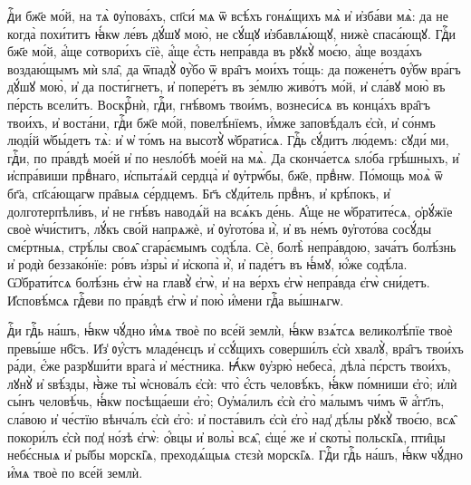 
%
дⷭ҇и бж҃е мо́й, на тѧ̀ ᲂу҆пова́хъ, сп҃си́ мѧ ѿ всѣ́хъ гонѧ́щихъ мѧ̀ и҆ и҆зба́ви мѧ̀:
да не когда̀ похи́титъ ꙗ҆́кѡ ле́въ дꙋ́шꙋ мою̀, не сꙋ́щꙋ и҆збавлѧ́ющꙋ, нижѐ спаса́ющꙋ.
Гдⷭ҇и бж҃е мо́й, а҆́ще сотвори́хъ сїѐ, а҆́ще є҆́сть непра́вда въ рꙋкꙋ̀ моє́ю,
а҆́ще возда́хъ воздаю́щымъ мѝ ѕла̑, да ѿпадꙋ̀ ᲂу҆̀бо ѿ вра̑гъ мои́хъ то́щь:
да пожене́тъ ᲂу҆́бѡ вра́гъ дꙋ́шꙋ мою̀, и҆ да пости́гнетъ, и҆ попере́тъ въ зе́млю живо́тъ мо́й, и҆ сла́вꙋ мою̀ въ пе́рсть всели́тъ.
Воскрⷭ҇нѝ, гдⷭ҇и, гнѣ́вомъ твои́мъ, вознеси́сѧ въ конца́хъ вра̑гъ твои́хъ, и҆ воста́ни, гдⷭ҇и бж҃е мо́й, повелѣ́нїемъ, и҆́мже заповѣ́далъ є҆сѝ,
и҆ со́нмъ люді́й ѡ҆бы́детъ тѧ̀: и҆ ѡ҆ то́мъ на высотꙋ̀ ѡ҆брати́сѧ.
Гдⷭ҇ь сꙋ́дитъ лю́демъ: сꙋди́ ми, гдⷭ҇и, по пра́вдѣ мое́й и҆ по неѕло́бѣ мое́й на мѧ̀.
Да сконча́етсѧ ѕло́ба грѣ́шныхъ, и҆ и҆спра́виши првⷣнаго, и҆спыта́ѧй сердца̀ и҆ ᲂу҆трѡ́бы, бж҃е, првⷣнѡ.
По́мощь моѧ̀ ѿ бг҃а, сп҃са́ющагѡ пра̑выѧ се́рдцемъ.
Бг҃ъ сꙋди́тель првⷣнъ, и҆ крѣ́покъ, и҆ долготерпѣли́въ, и҆ не гнѣ́въ наводѧ́й на всѧ́къ де́нь.
А҆́ще не ѡ҆братите́сѧ, ѻ҆рꙋ́жїе своѐ ѡ҆чи́ститъ, лꙋ́къ сво́й напрѧжѐ, и҆ ᲂу҆гото́ва и҆̀,
и҆ въ не́мъ ᲂу҆гото́ва сосꙋ́ды смє́ртныѧ, стрѣ́лы своѧ̑ сгара́ємымъ содѣ́ла.
Сѐ, болѣ̀ непра́вдою, зача́тъ болѣ́знь и҆ родѝ беззако́нїе:
ро́въ и҆зры̀ и҆ и҆скопа̀ и҆̀, и҆ паде́тъ въ ꙗ҆́мꙋ, ю҆́же содѣ́ла.
Ѡ҆брати́тсѧ болѣ́знь є҆гѡ̀ на главꙋ̀ є҆гѡ̀, и҆ на ве́рхъ є҆гѡ̀ непра́вда є҆гѡ̀ сни́детъ.
И҆сповѣ́мсѧ гдⷭ҇еви по пра́вдѣ є҆гѡ̀ и҆ пою̀ и҆́мени гдⷭ҇а вы́шнѧгѡ.


%
дⷭ҇и гдⷭ҇ь на́шъ, ꙗ҆́кѡ чꙋ́дно и҆́мѧ твоѐ по все́й землѝ, ꙗ҆́кѡ взѧ́тсѧ великолѣ́пїе твоѐ превы́ше нб҃съ.
И҆з̾ ᲂу҆́стъ младе́нєцъ и҆ ссꙋ́щихъ соверши́лъ є҆сѝ хвалꙋ̀, вра̑гъ твои́хъ ра́ди, є҆́же разрꙋши́ти врага̀ и҆ ме́стника.
Ꙗ҆́кѡ ᲂу҆зрю̀ небеса̀, дѣла̀ пє́рстъ твои́хъ, лꙋнꙋ̀ и҆ ѕвѣ́зды, ꙗ҆̀же ты̀ ѡ҆снова́лъ є҆сѝ:
что̀ є҆́сть человѣ́къ, ꙗ҆́кѡ по́мниши є҆го̀; и҆лѝ сы́нъ человѣ́чь, ꙗ҆́кѡ посѣща́еши є҆го̀;
Оу҆ма́лилъ є҆сѝ є҆го̀ ма́лымъ чи́мъ ѿ а҆́гг҃лъ, сла́вою и҆ че́стїю вѣнча́лъ є҆сѝ є҆го̀:
и҆ поста́вилъ є҆сѝ є҆го̀ над̾ дѣ́лы рꙋкꙋ̀ твоє́ю, всѧ̑ покори́лъ є҆сѝ под̾ но́зѣ є҆гѡ̀:
ѻ҆́вцы и҆ волы̀ всѧ̑, є҆ще́ же и҆ скоты̀ польскі̑ѧ,
пти̑цы небє́сныѧ и҆ ры̑бы морскі̑ѧ, преходѧ́щыѧ стєзѝ морскі̑ѧ.
Гдⷭ҇и гдⷭ҇ь на́шъ, ꙗ҆́кѡ чꙋ́дно и҆́мѧ твоѐ по все́й землѝ.


